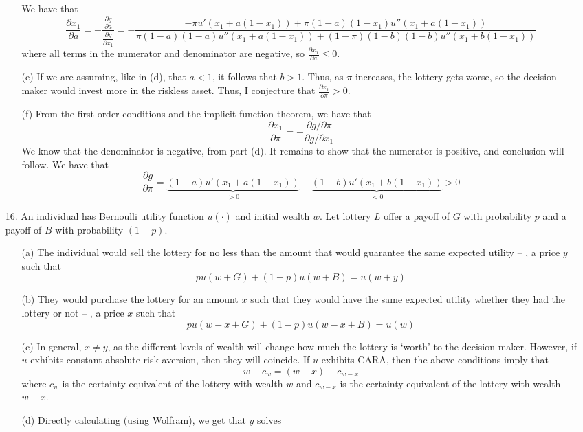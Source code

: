 \documentclass[12pt]{article}
\begin{document}
\begin{itemize}
\begin{itemize}
\[		\]
		We have that
		\[
		\frac{\partial x_1}{\partial a} = -\frac{\frac{\partial g}{\partial a }}{\frac{\partial g}{\partial x_1}} = -\frac{-\pi u'(x_1 + a(1-x_1)) + \pi(1-a)(1-x_1)u''(x_1 +a(1-x_1))}{\pi(1-a)(1-a) u''(x_1+a(1-x_1)) + (1-\pi)(1-b)(1-b)u''(x_1 + b(1-x_1))}
		\]
		where all terms in the numerator and denominator are negative, so $\frac{\partial x_1}{\partial a} \le 0$.
		\item[(e)] If we are assuming, like in (d), that $a < 1$, it follows that $b > 1$. Thus, as $\pi$ increases, the lottery gets worse, so the decision maker would invest more in the riskless asset. Thus, I conjecture that $\frac{\partial x_1}{\partial \pi} > 0$.
		\item[(f)] From the first order conditions and the implicit function theorem, we have that
		\[
		\frac{\partial x_1}{\partial \pi} = -\frac{\partial g / \partial \pi}{\partial g / \partial x_1}
		\]
		We know that the denominator is negative, from part (d). It remains to show that the numerator is positive, and conclusion will follow. We have that
		\[
		\frac{\partial g}{\partial \pi} = \underbrace{(1-a)u'(x_1 + a(1-x_1))}_{> 0} - \underbrace{(1-b)u'(x_1 + b(1-x_1))}_{<0} > 0
		\]
	\end{itemize}
	\item[16.] An individual has Bernoulli utility function $u(\cdot)$ and initial wealth $w$. Let lottery $L$ offer a payoff of $G$ with probability $p$ and a payoff of $B$ with probability $(1-p)$.
	\begin{itemize}
		\item[(a)] The individual would sell the lottery for no less than the amount that would guarantee the same expected utility -- \ie, a price $y$ such that
		\[
		p u(w + G) + (1-p)u(w + B) = u(w + y)
		\]
		\item[(b)] They would purchase the lottery for an amount $x$ such that they would have the same expected utility whether they had the lottery or not -- \ie, a price $x$ such that
		\[
		p u(w - x + G) + (1-p)u(w - x+B) = u(w)
		\]
		\item[(c)] In general, $x \ne y$, as the different levels of wealth will change how much the lottery is `worth' to the decision maker. However, if $u$ exhibits constant absolute risk aversion, then they will coincide. If $u$ exhibits CARA, then the above conditions imply that
		\[
		w - c_w = (w-x) - c_{w - x}
		\]
		where $c_w$ is the certainty equivalent of the lottery with wealth $w$ and $c_{w-x}$ is the certainty equivalent of the lottery with wealth $w-x$.
		\item[(d)] Directly calculating (using Wolfram), we get that $y$ solves

\end{itemize}
\end{itemize}
\end{document}
